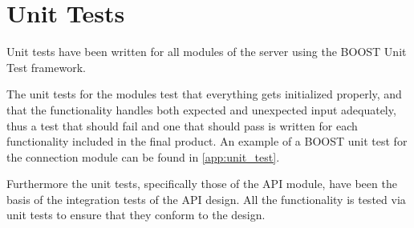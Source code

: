 \section{Unit Tests}
Unit tests have been written for all modules of the server using the BOOST Unit Test framework. 

The unit tests for the modules test that everything gets initialized properly, and that the functionality handles both expected and unexpected input adequately, thus a test that should fail and one that should pass is written for each functionality included in the final product. An example of a BOOST unit test for the connection module can be found in \autoref{app:unit_test}.

Furthermore the unit tests, specifically those of the API module, have been the basis of the integration tests of the API design. All the functionality is tested via unit tests to ensure that they conform to the design.

